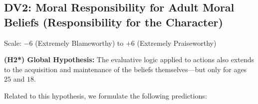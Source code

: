 \documentclass[scrarticle]{scrartcl}
\begin{document}
\subsection*{DV2: Moral Responsibility for Adult Moral Beliefs (Responsibility for the Character)}
Scale: $-6$ (Extremely Blameworthy) to $+6$ (Extremely Praiseworthy)

\vspace{0.75em}
\noindent \textsf{\textbf{(H2*) Global Hypothesis:}}
The evaluative logic applied to actions also extends to the acquisition and maintenance of the beliefs themselves---but only for ages $25$ and $18$.

\vspace{0.75em}
\noindent Related to this hypothesis, we formulate the following predictions:
\end{document}
